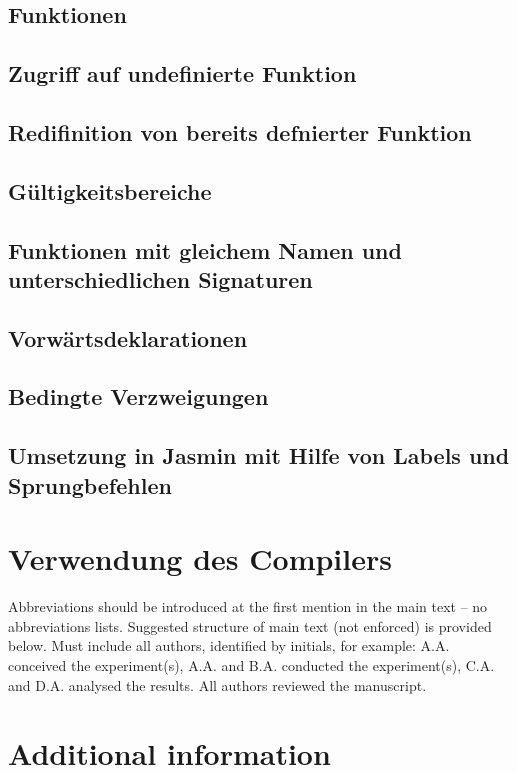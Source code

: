 \documentclass[12pt, a4paper, oneside, ngerman]{article}
\begin{document}
\subsection{Funktionen}
\subsection*{Zugriff auf undefinierte Funktion}
\subsection*{Redifinition von bereits defnierter Funktion}
\subsection*{Gültigkeitsbereiche}
\subsection*{Funktionen mit gleichem Namen und unterschiedlichen Signaturen}
\subsection*{Vorwärtsdeklarationen}

\subsection{Bedingte Verzweigungen}
\subsection*{Umsetzung in Jasmin mit Hilfe von Labels und Sprungbefehlen}



\pagebreak
\section{Verwendung des Compilers}
Abbreviations should be introduced at the first mention in the main text – no abbreviations lists. Suggested structure of main text (not enforced) is provided below.
Must include all authors, identified by initials, for example:
A.A. conceived the experiment(s),  A.A. and B.A. conducted the experiment(s), C.A. and D.A. analysed the results.  All authors reviewed the manuscript.

\section*{Additional information}
\end{document}

